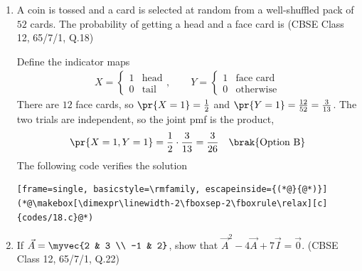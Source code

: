 \begin{enumerate}[label=\thesubsection.\arabic*, ref=\thesubsection.\theenumi]
\item
A coin is tossed and a card is selected at random from a well-shuffled pack of $52$ cards. The probability of getting a head and a face card is
\hfill (CBSE Class 12, 65/7/1, Q.18)

\solution
Define the indicator maps
\begin{align}
	X = \begin{cases} 1 & \text{head} \\ 0 & \text{tail} \end{cases}, \qquad
	Y = \begin{cases} 1 & \text{face card} \\ 0 & \text{otherwise} \end{cases}
\end{align}
There are $12$ face cards, so $\pr{X=1} = \frac{1}{2}$ and $\pr{Y=1} = \frac{12}{52} = \frac{3}{13}$. The two trials are independent, so the joint pmf is the product,
\begin{align}
	\pr{X=1, Y=1} = \frac{1}{2}\cdot\frac{3}{13} = \frac{3}{26} \quad \brak{\text{Option B}}
\end{align}
The following code verifies the solution
\begin{lstlisting}[frame=single, basicstyle=\rmfamily, escapeinside={(*@}{@*)}]
(*@\makebox[\dimexpr\linewidth-2\fboxsep-2\fboxrule\relax][c]{codes/18.c}@*)
\end{lstlisting}

\item
If $\vec{A} = \myvec{2 & 3 \\ -1 & 2}$, show that $\vec{A}^2 - 4\vec{A} + 7\vec{I} = \vec{0}$.
\hfill (CBSE Class 12, 65/7/1, Q.22)


\end{enumerate}
